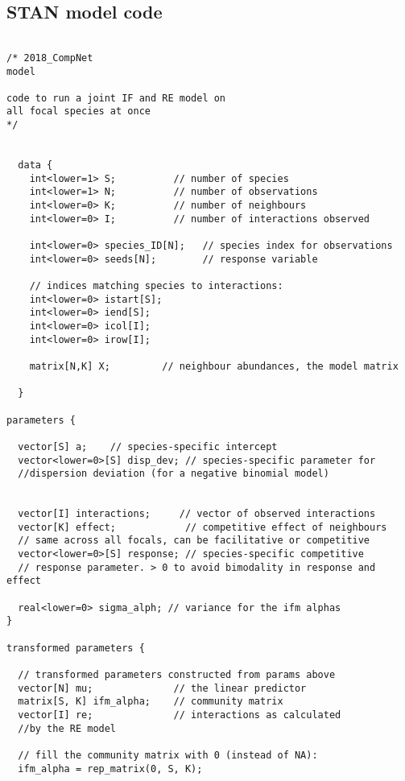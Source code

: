 \documentclass[a4,12pt]{article}
\begin{document}
        \subsection{STAN model code}

        \begin{lstlisting}

/* 2018_CompNet
model

code to run a joint IF and RE model on 
all focal species at once
*/ 
  
  
  data {
    int<lower=1> S;          // number of species 
    int<lower=1> N;          // number of observations
    int<lower=0> K;          // number of neighbours 
    int<lower=0> I;          // number of interactions observed
    
    int<lower=0> species_ID[N];   // species index for observations
    int<lower=0> seeds[N];        // response variable 
    
    // indices matching species to interactions:
    int<lower=0> istart[S];  
    int<lower=0> iend[S];
    int<lower=0> icol[I];
    int<lower=0> irow[I];
    
    matrix[N,K] X;         // neighbour abundances, the model matrix
  
  } 

parameters {
  
  vector[S] a;    // species-specific intercept
  vector<lower=0>[S] disp_dev; // species-specific parameter for 
  //dispersion deviation (for a negative binomial model)
  
  
  vector[I] interactions;     // vector of observed interactions
  vector[K] effect;            // competitive effect of neighbours
  // same across all focals, can be facilitative or competitive
  vector<lower=0>[S] response; // species-specific competitive 
  // response parameter. > 0 to avoid bimodality in response and effect  

  real<lower=0> sigma_alph; // variance for the ifm alphas
} 

transformed parameters {
  
  // transformed parameters constructed from params above
  vector[N] mu;              // the linear predictor
  matrix[S, K] ifm_alpha;    // community matrix 
  vector[I] re;              // interactions as calculated 
  //by the RE model
  
  // fill the community matrix with 0 (instead of NA):
  ifm_alpha = rep_matrix(0, S, K);   
  

\end{lstlisting}
\end{document}
